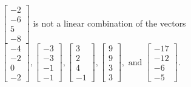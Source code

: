 \begin{exercise}
\begin{exerciseStatement}
  \end{exerciseStatement}
  \begin{exerciseAnswer}
   \(\left[\begin{array}{c}
-2 \\
-6 \\
5 \\
-8
\end{array}\right]\) 
  	 is not  
	a linear combination of the vectors \(\left[\begin{array}{c}
-4 \\
-2 \\
0 \\
-2
\end{array}\right] , \left[\begin{array}{c}
-3 \\
-3 \\
-1 \\
-1
\end{array}\right] , \left[\begin{array}{c}
3 \\
2 \\
4 \\
-1
\end{array}\right] , \left[\begin{array}{c}
9 \\
9 \\
3 \\
3
\end{array}\right] , \text{ and } \left[\begin{array}{c}
-17 \\
-12 \\
-6 \\
-5
\end{array}\right]\).

	
  


  \end{exerciseAnswer}
\end{exercise}